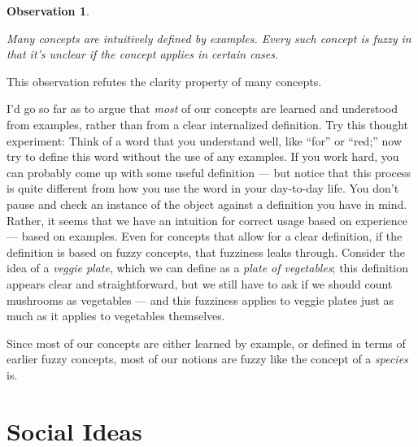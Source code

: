 \documentclass[9pt, twoside]{book}
\newtheorem{obs}{Observation}
\theoremstyle{argtstyle}
\begin{document}
\newcommand{\obsseven}{
    Many concepts are intuitively defined by examples.
    Every such concept is {\em fuzzy} in that it's unclear if the concept
    applies in certain cases.
}
\begin{obs}\label{o7}
    \obsseven
\end{obs}

This observation refutes the clarity property of many concepts.

I'd go so far as to argue that {\em most} of our concepts are learned and
understood from examples, rather than from a clear internalized definition.
Try this thought experiment: Think of a word that you understand well, like
``for'' or ``red;'' now try to define this word without the use of any examples.
If you work hard, you can probably come up with some useful definition --- but
notice that this process is quite different from how you use the word in your
day-to-day life. You don't pause and check an instance of the object against a
definition you have in mind. Rather, it seems that we have an intuition for
correct usage based on experience --- based on examples.
Even for concepts that allow for a clear definition, if the definition is based
on fuzzy concepts, that fuzziness leaks through. Consider the idea of a {\em
veggie plate}, which we can define as a {\em plate of vegetables}; this
definition appears clear and straightforward, but we still have to ask if we
should count mushrooms as vegetables --- and this fuzziness applies to veggie
plates just as much as it applies to vegetables themselves.

Since most of our concepts are either learned by example, or defined in terms of
earlier fuzzy concepts,
most of our notions are fuzzy like the concept of a {\em species} is.

\section{Social Ideas}

%
%
\end{document}
